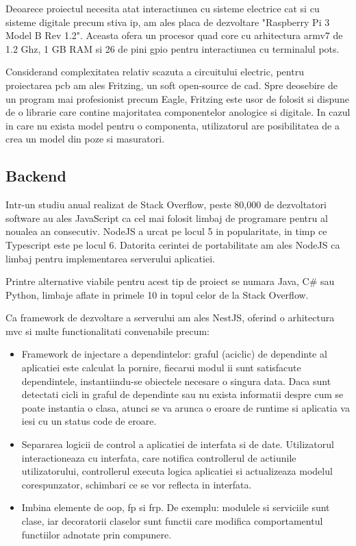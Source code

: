 Deoarece proiectul necesita atat interactiunea cu sisteme electrice cat si cu sisteme digitale precum stiva \acrshort{ip}, am ales placa de dezvoltare "Raspberry Pi 3 Model B Rev 1.2". Aceasta ofera un procesor quad core cu arhitectura armv7 de 1.2 Ghz, 1 GB RAM si 26 de pini \acrfull{gpio} pentru interactiunea cu terminalul \acrshort{pots}.

Considerand complexitatea relativ scazuta a circuitului electric, pentru proiectarea \acrshort{pcb} am ales Fritzing, un soft open-source de \acrfull{cad}. Spre deosebire de un program mai profesionist precum Eagle, Fritzing este usor de folosit si dispune de o librarie care contine majoritatea componentelor anologice si digitale. In cazul in care nu exista model pentru o componenta, utilizatorul are posibilitatea de a crea un model din poze si masuratori. 

\subsection {Backend}

Intr-un studiu anual realizat de Stack Overflow, peste 80,000 de dezvoltatori software au ales JavaScript ca cel mai folosit limbaj de programare pentru al noualea an consecutiv. NodeJS a urcat pe locul 5 in popularitate, in timp ce Typescript este pe locul 6. Datorita cerintei de portabilitate am ales NodeJS ca limbaj pentru implementarea serverului aplicatiei. \cite{StackOverflow2021Survey}

Printre alternative viabile pentru acest tip de proiect se numara Java, C\# sau Python, limbaje aflate in primele 10 in topul celor de la Stack Overflow.

Ca framework de dezvoltare a serverului am ales NestJS, oferind o arhitectura \acrfull{mvc} si multe functionalitati convenabile precum:

\begin{itemize}
  \item Framework de injectare a dependintelor: graful (aciclic) de dependinte al aplicatiei este calculat la pornire, fiecarui modul ii sunt satisfacute dependintele, instantiindu-se obiectele necesare o singura data. Daca sunt detectati cicli in graful de dependinte sau nu exista informatii despre cum se poate instantia o clasa, atunci se va arunca o eroare de runtime si aplicatia va iesi cu un status code de eroare. 
  \item Separarea logicii de control a aplicatiei de interfata si de date. Utilizatorul interactioneaza cu interfata, care notifica controllerul de actiunile utilizatorului, controllerul executa logica aplicatiei si actualizeaza modelul corespunzator, schimbari ce se vor reflecta in interfata.
  \item Imbina elemente de \acrfull{oop}, \acrfull{fp} si \acrfull{frp}. De exemplu: modulele si serviciile sunt clase, iar decoratorii claselor sunt functii care modifica comportamentul functiilor adnotate prin compunere.

\end{itemize}

